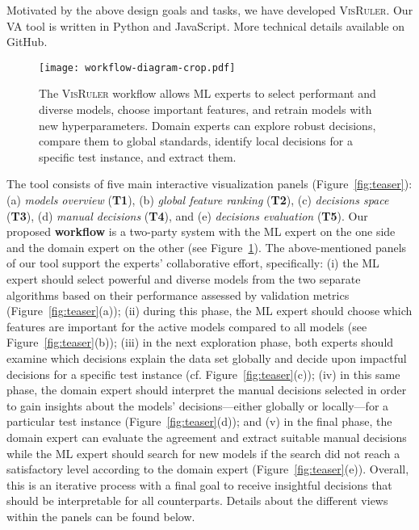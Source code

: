 Motivated by the above design goals and tasks, we have developed \textsc{VisRuler}. Our VA tool is written in Python and JavaScript. More technical details available on GitHub.~\cite{VisRulerCode}

\begin{figure}[tb]
\centering
\texttt{[image: workflow-diagram-crop.pdf]}
\caption{The \textsc{VisRuler} workflow allows ML experts to select performant and diverse models, choose important features, and retrain models with new hyperparameters. Domain experts can explore robust decisions, compare them to global standards, identify local decisions for a specific test instance, and extract them.}
\label{fig:workflow-diagram}
\end{figure}

The tool consists of five main interactive visualization panels (Figure~\ref{fig:teaser}): (a) \emph{models overview} (\textbf{T1}), (b) \emph{global feature ranking} (\textbf{T2}), (c) \emph{decisions space} (\textbf{T3}), (d) \emph{manual decisions} (\textbf{T4}), and (e) \emph{decisions evaluation} (\textbf{T5}).
%
Our proposed \textbf{workflow} is a two-party system with the ML expert on the one side and the domain expert on the other (see Figure~\ref{fig:workflow-diagram}). The above-mentioned panels of our tool support the experts' collaborative effort, specifically: (i) the ML expert should select powerful and diverse models from the two separate algorithms based on their performance assessed by validation metrics (Figure~\ref{fig:teaser}(a));
(ii) during this phase, the ML expert should choose which features are important for the active models compared to all models (see Figure~\ref{fig:teaser}(b));
(iii) in the next exploration phase, both experts should examine which decisions explain the data set globally and decide upon impactful decisions for a specific test instance (cf. Figure~\ref{fig:teaser}(c)); 
(iv) in this same phase, the domain expert should interpret the manual decisions selected in order to gain insights about the models' decisions---either globally or locally---for a particular test instance (Figure~\ref{fig:teaser}(d)); and 
(v) in the final phase, the domain expert can evaluate the agreement and extract suitable manual decisions while the ML expert should search for new models if the search did not reach a satisfactory level according to the domain expert (Figure~\ref{fig:teaser}(e)). Overall, this is an iterative process with a final goal to receive insightful decisions that should be interpretable for all counterparts. Details about the different views within the panels can be found below.

